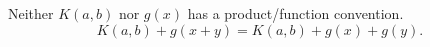 \documentclass{article}
\begin{document}
Neither $K(a,b)$ nor $g(x)$ has a product/function convention.
\begin{equation}
K(a,b)+g(x+y)=K(a,b)+g(x)+g(y).\label{binary-ambiguous}
\end{equation}
\end{document}
